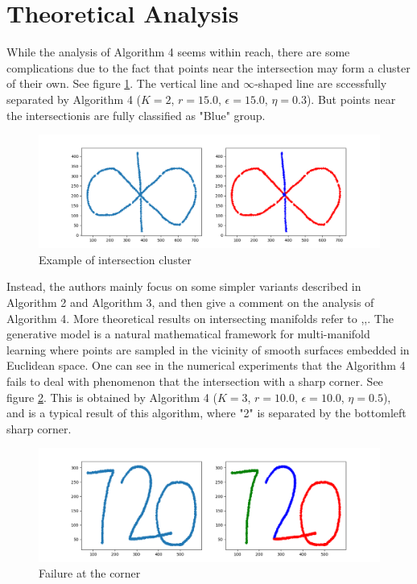 \documentclass[twoside,11pt]{article}
\begin{document}
\section{Theoretical Analysis}
While the analysis of Algorithm 4 seems within reach, there are some complications due to
the fact that points near the intersection may form a cluster of their own. See figure \ref{fig1}.
The vertical line and $\infty$-shaped line are sccessfully separated by Algorithm 4 ($K = 2$, $r = 15.0$, $\epsilon = 15.0$, $\eta = 0.3$).
But points near the intersectionis are fully classified as "Blue" group. 
\begin{figure}[htbp]
\centering
\vspace{-1em}
\includegraphics[width=1.0  \textwidth]{infinity_shape.png}
\vspace{-2em}
\caption{Example of intersection cluster}
\label{fig1}
\end{figure}

Instead, the authors mainly focus on some simpler variants described in Algorithm 2
and Algorithm 3, and then give a comment on the analysis of Algorithm 4. More theoretical results on intersecting manifolds 
refer to \cite{arias2011},\cite{chen2009},\cite{soltanolkotabi2012}. The generative model is a natural mathematical framework for multi-manifold learning where points are sampled in the vicinity of smooth surfaces embedded in Euclidean
space. One can see in the numerical experiments that the Algorithm 4 fails to deal with phenomenon that the intersection with a sharp corner. See figure \ref{fig2}. This is obtained by  Algorithm 4  ($K = 3$, $r = 10.0$, $\epsilon = 10.0$, $\eta = 0.5$), and is a typical result of this algorithm, where "2" is separated by the bottomleft sharp corner.
\begin{figure}[htbp]
\centering
\vspace{-1em}
\includegraphics[width=1.0  \textwidth]{sharp_720.png}
\vspace{-2em}
\caption{Failure at the corner}
\label{fig2}
\end{figure}
\end{document}
